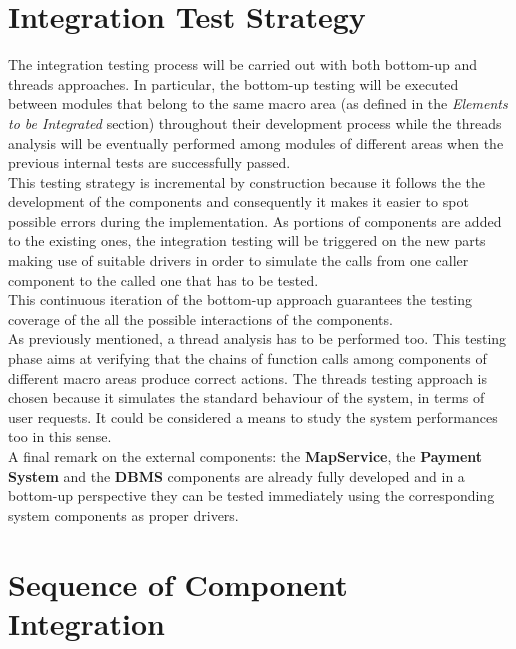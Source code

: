 \documentclass[11pt,a4paper]{report}
\begin{document}
\section{Integration Test Strategy}
The integration testing process will be carried out with both bottom-up and threads approaches. In particular, the bottom-up testing will be executed between modules that belong to the same macro area (as defined in the \textit{Elements to be Integrated} section) throughout their development process while the threads analysis will be eventually performed among modules of different areas when the previous internal tests are successfully passed.\\
This testing strategy is incremental by construction because it follows the the development of the components and consequently it makes it easier to spot possible errors during the implementation. As portions of components are added to the existing ones, the integration testing will be triggered on the new parts making use of suitable drivers in order to simulate the calls from one caller component to the called one that has to be tested.\\
This continuous iteration of the bottom-up approach guarantees the testing coverage of the all the possible interactions of the components.\\
As previously mentioned, a thread analysis has to be performed too. This testing phase aims at verifying that the chains of function calls among components of different macro areas produce correct actions. The threads testing approach is chosen because it simulates the standard behaviour of the system, in terms of user requests. It could be considered a means to study the system performances too in this sense.\\
A final remark on the external components: the \textbf{MapService}, the \textbf{Payment System} and the \textbf{DBMS} components are already fully developed and in a bottom-up perspective they can be tested immediately using the corresponding system components as proper drivers. 
\section{Sequence of Component Integration}
\end{document}
